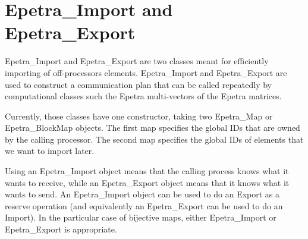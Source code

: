 
\section{Epetra\_Import and Epetra\_Export}
\label{sec:import_export}

Epetra\_Import and Epetra\_Export are two classes meant for efficiently
importing of off-processors elements. Epetra\_Import and Epetra\_Export
are used to construct a communication plan that can be called repeatedly
by computational classes such the Epetra multi-vectors of the Epetra
matrices.

Currently, those classes have one constructor, taking two Epetra\_Map or
Epetra\_BlockMap objects. The first map specifies the global IDs that
are owned by the calling processor. The second map specifies the global
IDs of  elements that we want to import later.

Using an Epetra\_Import object means that the calling process knows what
it wants to receive, while an Epetra\_Export object means that it knows
what it wants to send. An Epetra\_Import object can be used to do an
Export as a reserve operation (and equivalently an Epetra\_Export can be
used to do an Import). In the particular case of bijective maps, either
Epetra\_Import or Epetra\_Export is appropriate.

\medskip

